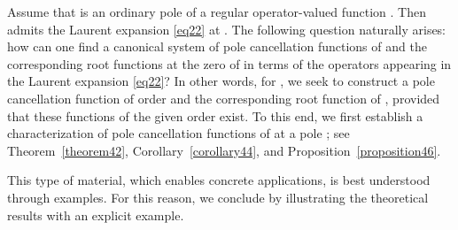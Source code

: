 \documentclass[11pt, reqno]{amsart}
\makeatletter
\theoremstyle{plain}
\theoremstyle{remark}
\newcounter{str}
\numberwithin{equation}{section}
\newcounter{mathrecordid}
\newcommand{\mathboxbegin}[1]{%
  \stepcounter{mathrecordid}%
  \immediate\write\mathrecords{\themathrecordid,#1}%
  \special{pdf:bann << /Type /Annot /Subtype /Link /Border [0 0 0]
    /MathBoxID \themathrecordid /F 2
    /A << /S /URI /URI (urn:mathbox:\themathrecordid) >> >>}}
\newcommand{\mathboxinlineplain}[1]{$#1$}
\newcommand{\mathboxinline}[1]{%
  $\mathboxbegin{inline}#1\special{pdf:eann}$}
\newcommand{\recordmath}{%
  \ifmeasuring@\expandafter\mathboxinlineplain
  \else\expandafter\mathboxinline\fi}
\makeatother
\begin{document}
Assume that \recordmath{\beta \in \mathbb{C}} is an ordinary pole of a regular operator-valued function \recordmath{Q}. Then \recordmath{Q} admits the Laurent expansion \eqref{eq22} at \recordmath{\beta}. The following question naturally arises: how can one find a canonical system of pole cancellation functions of \recordmath{Q} and the corresponding root functions at the zero \recordmath{\beta} of \recordmath{Q^{-1}} in terms of the operators appearing in the Laurent expansion \eqref{eq22}? In other words, for \recordmath{k \le m}, we seek to construct a pole cancellation function of order \recordmath{k} and the corresponding root function of \recordmath{Q^{-1}}, provided that these functions of the given order \recordmath{k} exist. To this end, we first establish a characterization of pole cancellation functions of \recordmath{Q} at a pole \recordmath{\beta}; see Theorem~\ref{theorem42}, Corollary~\ref{corollary44}, and Proposition~\ref{proposition46}.

This type of material, which enables concrete applications, is best understood through examples. For this reason, we conclude by illustrating the theoretical results with an explicit example.
\end{document}
